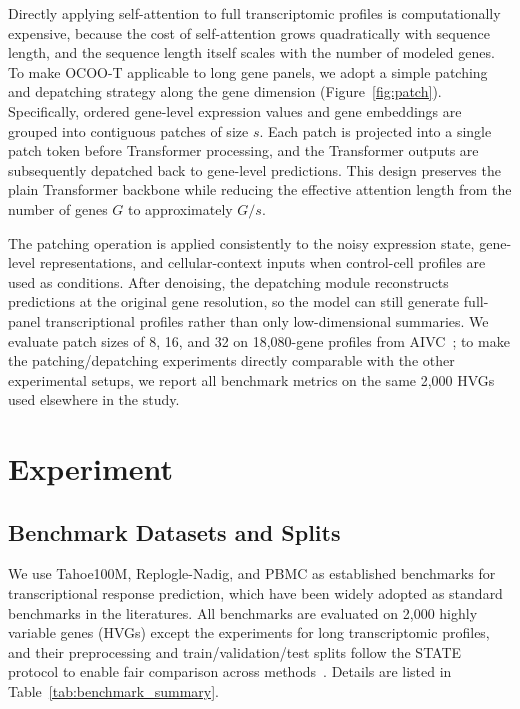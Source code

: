 \documentclass[11pt]{article}
\begin{document}
Directly applying self-attention to full transcriptomic profiles is computationally expensive, because the cost of self-attention grows quadratically with sequence length, and the sequence length itself scales with the number of modeled genes. To make OCOO-T applicable to long gene panels, we adopt a simple patching and depatching strategy along the gene dimension (Figure~\ref{fig:patch}). Specifically, ordered gene-level expression values and gene embeddings are grouped into contiguous patches of size \(s\). Each patch is projected into a single patch token before Transformer processing, and the Transformer outputs are subsequently depatched back to gene-level predictions. This design preserves the plain Transformer backbone while reducing the effective attention length from the number of genes \(G\) to approximately \(G/s\).

The patching operation is applied consistently to the noisy expression state, gene-level representations, and cellular-context inputs when control-cell profiles are used as conditions. After denoising, the depatching module reconstructs predictions at the original gene resolution, so the model can still generate full-panel transcriptional profiles rather than only low-dimensional summaries. We evaluate patch sizes of 8, 16, and 32 on 18,080-gene profiles from AIVC~\cite{roohani2025virtualcellchallenge}; to make the patching/depatching experiments directly comparable with the other experimental setups, we report all benchmark metrics on the same 2,000 HVGs used elsewhere in the study.

\section{Experiment}

\subsection{Benchmark Datasets and Splits}

We use Tahoe100M, Replogle-Nadig, and PBMC as established benchmarks for transcriptional response prediction, which have been widely adopted as standard benchmarks in the literatures. All benchmarks are evaluated on 2,000 highly variable genes (HVGs) except the experiments for long transcriptomic profiles, and their preprocessing and train/validation/test splits follow the STATE protocol to enable fair comparison across methods~\cite{adduri2025state,yuan2026perturbdiff}. Details are listed in Table~\ref{tab:benchmark_summary}.
\end{document}
